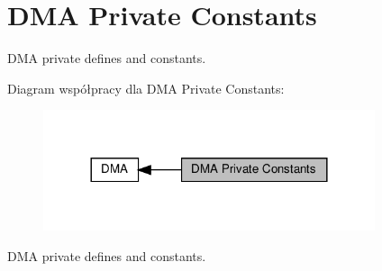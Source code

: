 \hypertarget{group___d_m_a___private___constants}{}\section{D\+MA Private Constants}
\label{group___d_m_a___private___constants}


D\+MA private defines and constants.  


Diagram współpracy dla D\+MA Private Constants\+:\nopagebreak
\begin{figure}[H]
\begin{center}
\leavevmode
\includegraphics[width=276pt]{group___d_m_a___private___constants}
\end{center}
\end{figure}
D\+MA private defines and constants. 

